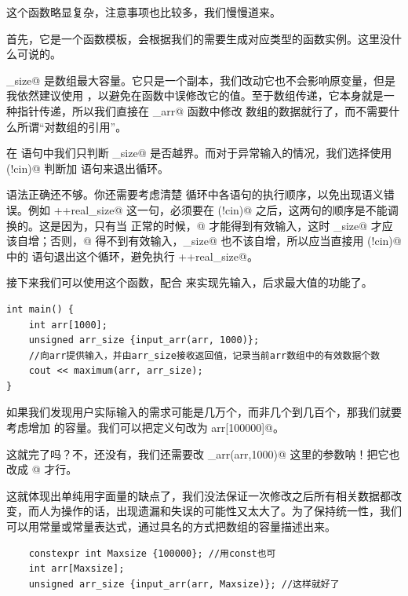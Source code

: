 这个函数略显复杂，注意事项也比较多，我们慢慢道来。\par
首先，它是一个函数模板，会根据我们的需要生成对应类型的函数实例。这里没什么可说的。\par
\lstinline@max_size@ 是数组最大容量。它只是一个副本，我们改动它也不会影响原变量，但是我依然建议使用 \lstinline@const@，以避免在函数中误修改它的值。至于数组传递，它本身就是一种指针传递，所以我们直接在 \lstinline@input_arr@ 函数中修改 \lstinline@arr@ 数组的数据就行了，而不需要什么所谓``对数组的引用''。\par
在 \lstinline@while@ 语句中我们只判断 \lstinline@real_size@ 是否越界。而对于异常输入的情况，我们选择使用 \lstinline@if(!cin)@ 判断加 \lstinline@break@ 语句来退出循环。\par
语法正确还不够。你还需要考虑清楚 \lstinline@while@ 循环中各语句的执行顺序，以免出现语义错误。例如 \lstinline@++real_size@ 这一句，必须要在 \lstinline@if(!cin)@ 之后，这两句的顺序是不能调换的。这是因为，只有当 \lstinline@cin@ 正常的时候，@ 才能得到有效输入，这时 \lstinline@real_size@ 才应该自增；否则，@ 得不到有效输入，\lstinline@real_size@ 也不该自增，所以应当直接用 \lstinline@if(!cin)@ 中的 \lstinline@break@ 语句退出这个循环，避免执行 \lstinline@++real_size@。\par
接下来我们可以使用这个函数，配合 \lstinline@maximum@ 来实现先输入，后求最大值的功能了。\par
\begin{lstlisting}
int main() {
    int arr[1000];
    unsigned arr_size {input_arr(arr, 1000)};
    //向arr提供输入，并由arr_size接收返回值，记录当前arr数组中的有效数据个数
    cout << maximum(arr, arr_size);
}
\end{lstlisting}\par
如果我们发现用户实际输入的需求可能是几万个，而非几个到几百个，那我们就要考虑增加 \lstinline@arr@ 的容量。我们可以把定义句改为 \lstinline@int arr[100000]@。\par
这就完了吗？不，还没有，我们还需要改 \lstinline@input_arr(arr,1000)@ 这里的参数呐！把它也改成 @ 才行。\par
这就体现出单纯用字面量的缺点了，我们没法保证一次修改之后所有相关数据都改变，而人为操作的话，出现遗漏和失误的可能性又太大了。为了保持统一性，我们可以用常量或常量表达式，通过具名的方式把数组的容量描述出来。
\begin{lstlisting}
    constexpr int Maxsize {100000}; //用const也可
    int arr[Maxsize];
    unsigned arr_size {input_arr(arr, Maxsize)}; //这样就好了
\end{lstlisting}
